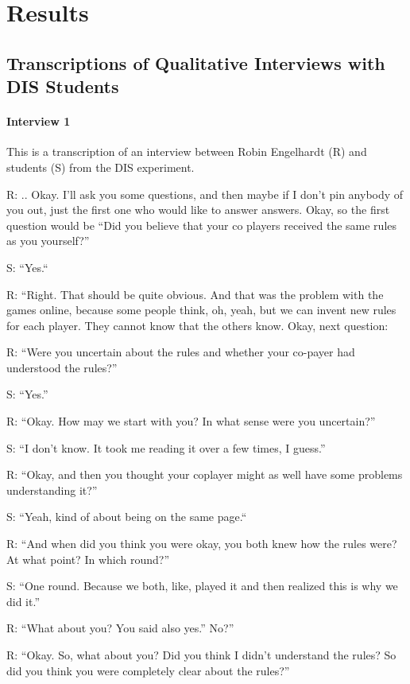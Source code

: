 \section{Results} 

\subsection{Transcriptions of Qualitative Interviews with DIS Students}


\paragraph{Interview 1}
This is a transcription of an interview between Robin Engelhardt (R) and students (S) from the DIS experiment.


\medskip
R: .. Okay. I'll ask you some questions, and then maybe if I don't pin anybody of you out, just the first one who would like to answer answers. Okay, so the first question would be 
“Did you believe that your co players received the same rules as you yourself?” 

S: “Yes.“

R: “Right. That should be quite obvious. And that was the problem with the games online, because some people think, oh, yeah, but we can invent new rules for each player. They cannot know that the others know. Okay, next question:

R: “Were you uncertain about the rules and whether your co-payer had understood the rules?” 

S: “Yes.”

R: “Okay. How may we start with you? In what sense were you uncertain?” 

S: “I don't know. It took me reading it over a few times, I guess.” 

R: “Okay, and then you thought your coplayer might as well have some problems understanding it?”

S: “Yeah, kind of about being on the same page.“

R: “And when did you think you were okay, you both knew how the rules were? At what point? In which round?”

S: “One round. Because we both, like, played it and then realized this is why we did it.” 

R: “What about you? You said also yes.” No?”

R: “Okay. So, what about you? Did you think I didn't understand the rules? So did you think you were completely clear about the rules?” 

